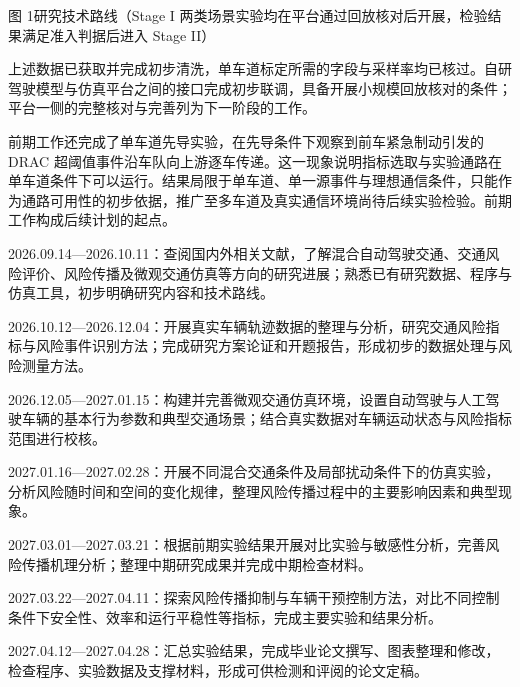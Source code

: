 \documentclass[oneside,doctype=proposal,fontset=windows,times=true]{tongjithesis}
\begin{document}
\begin{tjformbody}
\begin{center}

{\songti 图 1\quad 研究技术路线（Stage I 两类场景实验均在平台通过回放核对后开展，检验结果满足准入判据后进入 Stage II）}
\end{center}

%
上述数据已获取并完成初步清洗，单车道标定所需的字段与采样率均已核过。自研驾驶模型与仿真平台之间的接口完成初步联调，具备开展小规模回放核对的条件；平台一侧的完整核对与完善列为下一阶段的工作。

前期工作还完成了单车道先导实验，在先导条件下观察到前车紧急制动引发的 DRAC 超阈值事件沿车队向上游逐车传递。这一现象说明指标选取与实验通路在单车道条件下可以运行。结果局限于单车道、单一源事件与理想通信条件，只能作为通路可用性的初步依据，推广至多车道及真实通信环境尚待后续实验检验。前期工作构成后续计划的起点。
\end{tjformbody}
\begin{tjformbody}
2026.09.14—2026.10.11：查阅国内外相关文献，了解混合自动驾驶交通、交通风险评价、风险传播及微观交通仿真等方向的研究进展；熟悉已有研究数据、程序与仿真工具，初步明确研究内容和技术路线。

2026.10.12—2026.12.04：开展真实车辆轨迹数据的整理与分析，研究交通风险指标与风险事件识别方法；完成研究方案论证和开题报告，形成初步的数据处理与风险测量方法。

2026.12.05—2027.01.15：构建并完善微观交通仿真环境，设置自动驾驶与人工驾驶车辆的基本行为参数和典型交通场景；结合真实数据对车辆运动状态与风险指标范围进行校核。

2027.01.16—2027.02.28：开展不同混合交通条件及局部扰动条件下的仿真实验，分析风险随时间和空间的变化规律，整理风险传播过程中的主要影响因素和典型现象。

2027.03.01—2027.03.21：根据前期实验结果开展对比实验与敏感性分析，完善风险传播机理分析；整理中期研究成果并完成中期检查材料。

2027.03.22—2027.04.11：探索风险传播抑制与车辆干预控制方法，对比不同控制条件下安全性、效率和运行平稳性等指标，完成主要实验和结果分析。

2027.04.12—2027.04.28：汇总实验结果，完成毕业论文撰写、图表整理和修改，检查程序、实验数据及支撑材料，形成可供检测和评阅的论文定稿。
\end{tjformbody}
\end{document}
